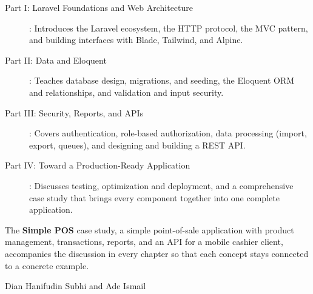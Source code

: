 \begin{description}
    \item[Part I: Laravel Foundations and Web Architecture]: Introduces the
          Laravel ecosystem, the HTTP protocol, the MVC pattern, and building
          interfaces with Blade, Tailwind, and Alpine.
    \item[Part II: Data and Eloquent]: Teaches database design, migrations,
          and seeding, the Eloquent ORM and relationships, and validation and
          input security.
    \item[Part III: Security, Reports, and APIs]: Covers authentication,
          role-based authorization, data processing (import, export, queues),
          and designing and building a REST API.
    \item[Part IV: Toward a Production-Ready Application]: Discusses testing,
          optimization and deployment, and a comprehensive case study that
          brings every component together into one complete application.
\end{description}

The \textbf{Simple POS} case study, a simple point-of-sale application with
product management, transactions, reports, and an API for a mobile cashier
client, accompanies the discussion in every chapter so that each concept
stays connected to a concrete example.

\vspace{1cm}

\noindent
Dian Hanifudin Subhi and Ade Ismail

\cleardoublepage
